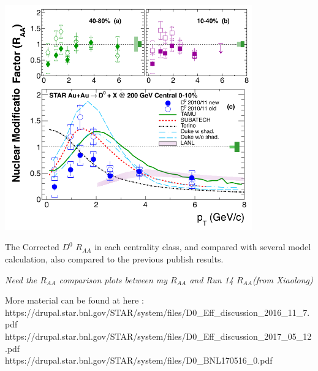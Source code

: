 \bfg \centering
\includegraphics[width=0.8\textwidth]{figure/Run11_YF/fig33.png}
\caption{The Corrected $D^0$ $R_{AA}$ in each centrality class, and compared with several model calculation, also compared to the previous publish results.}
\label{CorRaa33}
\efg

\emph{Need the $R_{AA}$ comparison plots between my $R_{AA}$  and Run 14 $R_{AA}$(from Xiaolong) }

More material can be found at here :  
\\https://drupal.star.bnl.gov/STAR/system/files/D0\_Eff\_discussion\_2016\_11\_7.pdf
\\https://drupal.star.bnl.gov/STAR/system/files/D0\_Eff\_discussion\_2017\_05\_12.pdf
\\https://drupal.star.bnl.gov/STAR/system/files/D0\_BNL170516\_0.pdf
% 



